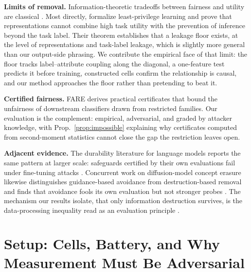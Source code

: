 \documentclass[letterpaper]{article} %
\begin{document}
\textbf{Limits of removal.}
Information-theoretic tradeoffs between fairness and utility are classical
\citep{zhao2019inherent}. Most directly, \citet{stadler2024} formalize
least-privilege learning and prove that representations cannot combine high
task utility with the prevention of inference beyond the task label. Their
theorem establishes that a leakage floor exists, at the level of
representations and task-label leakage, which is slightly more general than
our output-side phrasing. We contribute the empirical face of that limit: the
floor tracks label--attribute coupling along the diagonal, a one-feature test
predicts it before training, constructed cells confirm the relationship is
causal, and our method approaches the floor rather than pretending to beat it.

\textbf{Certified fairness.}
FARE \citep{jovanovic2023fare} derives practical certificates that bound the
unfairness of downstream classifiers drawn from restricted families. Our
evaluation is the complement: empirical, adversarial, and graded by attacker
knowledge, with Prop.~\ref{prop:impossible} explaining why certificates
computed from second-moment statistics cannot close the gap the restriction
leaves open.

\textbf{Adjacent evidence.}
The durability literature for language models reports the same pattern at
larger scale: safeguards certified by their own evaluations fail under
fine-tuning attacks \citep{tamirisa2024tar,qi2024durability}. Concurrent work
on diffusion-model concept erasure likewise distinguishes guidance-based
avoidance from destruction-based removal and finds that avoidance fools its
own evaluation but not stronger probes \citep{lu2025erasure}. The mechanism
our results isolate, that only information destruction survives, is the
data-processing inequality read as an evaluation principle
\citep{dwork2014dp,cover2006it}.

\section{Setup: Cells, Battery, and Why Measurement Must Be Adversarial}
\end{document}
